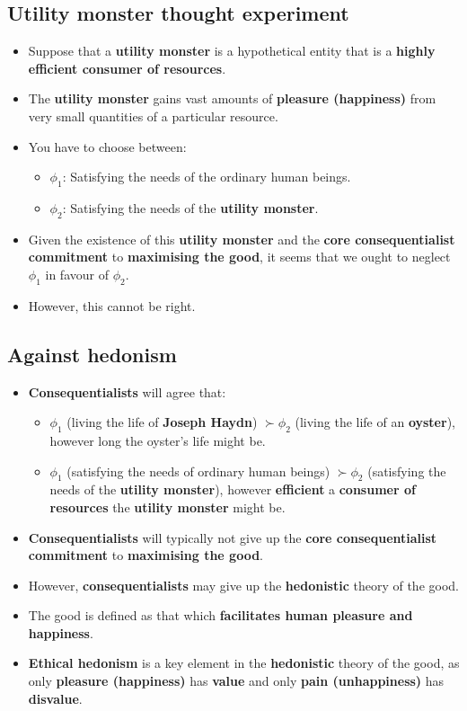 \documentclass[11pt]{article}
\begin{document}
\subsection{Utility monster thought experiment}
\label{sec:org74f751a}
\begin{itemize}
\item Suppose that a \textbf{utility monster} is a hypothetical entity that is a \textbf{highly efficient consumer of resources}.
\item The \textbf{utility monster} gains vast amounts of \textbf{pleasure (happiness)} from very small quantities of a particular resource.
\item You have to choose between:
\begin{itemize}
\item \(\phi_1\): Satisfying the needs of the ordinary human beings.
\item \(\phi_2\): Satisfying the needs of the \textbf{utility monster}.
\end{itemize}
\item Given the existence of this \textbf{utility monster} and the \textbf{core consequentialist commitment} to \textbf{maximising the good}, it seems that we ought to neglect \(\phi_1\) in favour of \(\phi_2\).
\item However, this cannot be right.
\end{itemize}
\subsection{Against hedonism}
\label{sec:org3c574b4}
\begin{itemize}
\item \textbf{Consequentialists} will agree that:
\begin{itemize}
\item \(\phi_1\) (living the life of \textbf{Joseph Haydn}) \(\succ \phi_2\) (living the life of an \textbf{oyster}), however long the oyster's life might be.
\item \(\phi_1\) (satisfying the needs of ordinary human beings) \(\succ \phi_2\) (satisfying the needs of the \textbf{utility monster}), however \textbf{efficient} a \textbf{consumer of resources} the \textbf{utility monster} might be.
\end{itemize}
\item \textbf{Consequentialists} will typically not give up the \textbf{core consequentialist commitment} to \textbf{maximising the good}.
\item However, \textbf{consequentialists} may give up the \textbf{hedonistic} theory of the good.
\item The good is defined as that which \textbf{facilitates human pleasure and happiness}.
\item \textbf{Ethical hedonism} is a key element in the \textbf{hedonistic} theory of the good, as only \textbf{pleasure (happiness)} has \textbf{value} and only \textbf{pain (unhappiness)} has \textbf{disvalue}.
\end{itemize}
\end{document}
